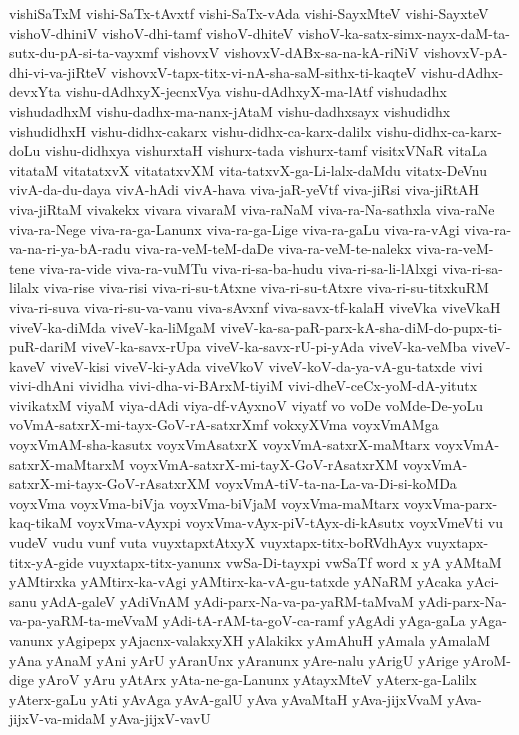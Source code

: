 {vishiSaTxM
vishi-SaTx-tAvxtf
vishi-SaTx-vAda
vishi-SayxMteV
vishi-SayxteV
vishoV-dhiniV
vishoV-dhi-tamf
vishoV-dhiteV
vishoV-ka-satx-simx-nayx-daM-ta-sutx-du-pA-si-ta-vayxmf
vishovxV
vishovxV-dABx-sa-na-kA-riNiV
vishovxV-pA-dhi-vi-va-jiRteV
vishovxV-tapx-titx-vi-nA-sha-saM-sithx-ti-kaqteV
vishu-dAdhx-devxYta
vishu-dAdhxyX-jecnxVya
vishu-dAdhxyX-ma-lAtf
vishudadhx
vishudadhxM
vishu-dadhx-ma-nanx-jAtaM
vishu-dadhxsayx
vishudidhx
vishudidhxH
vishu-didhx-cakarx
vishu-didhx-ca-karx-dalilx
vishu-didhx-ca-karx-doLu
vishu-didhxya
vishurxtaH
vishurx-tada
vishurx-tamf
visitxVNaR
vitaLa
vitataM
vitatatxvX
vitatatxvXM
vita-tatxvX-ga-Li-lalx-daMdu
vitatx-DeVnu
vivA-da-du-daya
vivA-hAdi
vivA-hava
viva-jaR-yeVtf
viva-jiRsi
viva-jiRtAH
viva-jiRtaM
vivakekx
vivara
vivaraM
viva-raNaM
viva-ra-Na-sathxla
viva-raNe
viva-ra-Nege
viva-ra-ga-Lanunx
viva-ra-ga-Lige
viva-ra-gaLu
viva-ra-vAgi
viva-ra-va-na-ri-ya-bA-radu
viva-ra-veM-teM-daDe
viva-ra-veM-te-nalekx
viva-ra-veM-tene
viva-ra-vide
viva-ra-vuMTu
viva-ri-sa-ba-hudu
viva-ri-sa-li-lAlxgi
viva-ri-sa-lilalx
viva-rise
viva-risi
viva-ri-su-tAtxne
viva-ri-su-tAtxre
viva-ri-su-titxkuRM
viva-ri-suva
viva-ri-su-va-vanu
viva-sAvxnf
viva-savx-tf-kalaH
viveVka
viveVkaH
viveV-ka-diMda
viveV-ka-liMgaM
viveV-ka-sa-paR-parx-kA-sha-diM-do-pupx-ti-puR-dariM
viveV-ka-savx-rUpa
viveV-ka-savx-rU-pi-yAda
viveV-ka-veMba
viveV-kaveV
viveV-kisi
viveV-ki-yAda
viveVkoV
viveV-koV-da-ya-vA-gu-tatxde
vivi
vivi-dhAni
vividha
vivi-dha-vi-BArxM-tiyiM
vivi-dheV-ceCx-yoM-dA-yitutx
vivikatxM
viyaM
viya-dAdi
viya-df-vAyxnoV
viyatf
vo
voDe
voMde-De-yoLu
voVmA-satxrX-mi-tayx-GoV-rA-satxrXmf
vokxyXVma
voyxVmAMga
voyxVmAM-sha-kasutx
voyxVmAsatxrX
voyxVmA-satxrX-maMtarx
voyxVmA-satxrX-maMtarxM
voyxVmA-satxrX-mi-tayX-GoV-rAsatxrXM
voyxVmA-satxrX-mi-tayx-GoV-rAsatxrXM
voyxVmA-tiV-ta-na-La-va-Di-si-koMDa
voyxVma
voyxVma-biVja
voyxVma-biVjaM
voyxVma-maMtarx
voyxVma-parx-kaq-tikaM
voyxVma-vAyxpi
voyxVma-vAyx-piV-tAyx-di-kAsutx
voyxVmeVti
vu
vudeV
vudu
vunf
vuta
vuyxtapxtAtxyX
vuyxtapx-titx-boRVdhAyx
vuyxtapx-titx-yA-gide
vuyxtapx-titx-yanunx
vwSa-Di-tayxpi
vwSaTf
word
x
yA
yAMtaM
yAMtirxka
yAMtirx-ka-vAgi
yAMtirx-ka-vA-gu-tatxde
yANaRM
yAcaka
yAci-sanu
yAdA-galeV
yAdiVnAM
yAdi-parx-Na-va-pa-yaRM-taMvaM
yAdi-parx-Na-va-pa-yaRM-ta-meVvaM
yAdi-tA-rAM-ta-goV-ca-ramf
yAgAdi
yAga-gaLa
yAga-vanunx
yAgipepx
yAjacnx-valakxyXH
yAlakikx
yAmAhuH
yAmala
yAmalaM
yAna
yAnaM
yAni
yArU
yAranUnx
yAranunx
yAre-nalu
yArigU
yArige
yAroM-dige
yAroV
yAru
yAtArx
yAta-ne-ga-Lanunx
yAtayxMteV
yAterx-ga-Lalilx
yAterx-gaLu
yAti
yAvAga
yAvA-galU
yAva
yAvaMtaH
yAva-jijxVvaM
yAva-jijxV-va-midaM
yAva-jijxV-vavU
}
